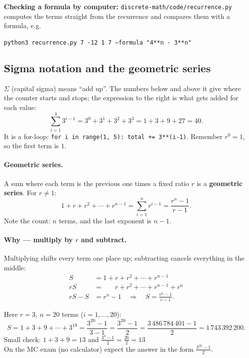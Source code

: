 \documentclass{fkt-notes}
\theoremstyle{definition}
\begin{document}
\noindent \textbf{Checking a formula by computer:}
\texttt{discrete-math/code/recurrence.py} computes the terms straight
from the recurrence and compares them with a formula, e.g.
\begin{center}
  \texttt{python3 recurrence.py 7 -12 1 7 --formula "4**n - 3**n"}
\end{center}

\subsection{Sigma notation and the geometric series}
$\Sigma$ (capital sigma) means ``add up''. The numbers below and above
it give where the counter starts and stops; the expression to the
right is what gets added for each value:
\[
  \sum_{i=1}^{4} 3^{i-1} = 3^{0} + 3^{1} + 3^{2} + 3^{3}
  = 1 + 3 + 9 + 27 = 40.
\]
It is a for-loop:
\texttt{for i in range(1, 5): total += 3**(i-1)}.
Remember $r^{0} = 1$, so the first term is $1$.

\paragraph{Geometric series.}
\begin{rulepar}
  A sum where each term is the previous one times a fixed ratio $r$ is
  a \textbf{geometric series}. For $r \neq 1$:
  \[
    1 + r + r^{2} + \cdots + r^{n-1}
    = \sum_{i=1}^{n} r^{i-1}
    = \frac{r^{n} - 1}{r - 1}.
  \]
  Note the count: $n$ terms, and the last exponent is $n - 1$.
\end{rulepar}

\paragraph{Why --- multiply by $r$ and subtract.} Multiplying shifts
every term one place up; subtracting cancels everything in the middle:
\begin{align*}
  S      & = 1 + r + r^{2} + \cdots + r^{n-1}                      \\
  rS     & = \phantom{1 + {}} r + r^{2} + \cdots + r^{n-1} + r^{n} \\
  rS - S & = r^{n} - 1
  \quad\Longrightarrow\quad
  S = \frac{r^{n} - 1}{r - 1}.
\end{align*}

\begin{example}[$\sum_{i=1}^{20} 3^{i-1}$]
  Here $r = 3$, $n = 20$ terms ($i = 1, \ldots, 20$):
  \[
    S = 1 + 3 + 9 + \cdots + 3^{19}
    = \frac{3^{20} - 1}{3 - 1}
    = \frac{3^{20} - 1}{2}
    = \frac{3\,486\,784\,401 - 1}{2}
    = 1\,743\,392\,200.
  \]
  Small check: $1 + 3 + 9 = 13$ and $\frac{3^{3} - 1}{2} =
    \frac{26}{2} = 13$ \checkmark\\
  On the MC exam (no calculator) expect the answer in the form
  $\frac{3^{20} - 1}{2}$.
\end{example}
\end{document}
